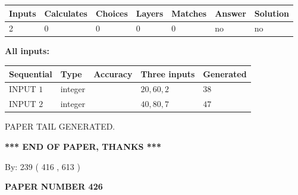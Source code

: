 \documentclass[12pt]{article}
\begin{document}
   
   
   
\noindent\begin{tabular}{|l|l|l|l|l|l|l|}
 \hline
Inputs & Calculates & Choices & Layers & Matches & Answer & Solution \\ \hline
 2  & 
 0  & 
 0
  & 
 0  & 
 0  & 
  no & 
  no 
  \\ \hline
 \end{tabular}
   
   
   
   
\noindent{}
   
   
   
   
\noindent\vspace{0.1in}\hspace{-0.08in} {\textbf{\Large{All inputs: }}}
   
   
  
  
\noindent\begin{tabular}{|l|l|l|l|l|}
\hline
 Sequential & Type & Accuracy & Three inputs & Generated \\ 
\hline
 
 
  INPUT $  1 $ & integer &  & $
 20
 , 
 60
 , 
 2
 $ & $ 38 $ 
 \\  \hline  
 
 
  INPUT $  2 $ & integer &  & $
 40
 , 
 80
 , 
 7
 $ & $ 47 $ 
 \\  \hline  
 \end{tabular}
   
   
   
   
   
   
 \vspace{0.2in}
 
   
   
\vspace{2.0in} PAPER TAIL GENERATED.
   
   
   
   
\vspace{1.0in} 
{\textbf{\large{ *** END OF PAPER, THANKS *** }}} 
   
   
\hspace{1.0in} By: 
 239 ( 416 ,  613 )
   
   
   
   
\newpage 
\setcounter{page}{ 
   426001 } 
   
   
   
   
 {\textbf{ \Large{ PAPER NUMBER  426  }}}
   
\end{document}

